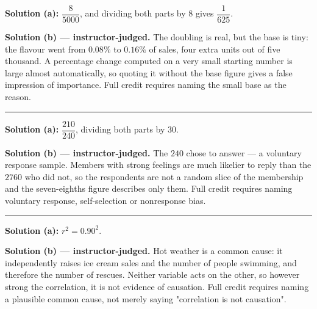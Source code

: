 \documentclass[12pt]{article}
\begin{document}




\textbf{Solution (a):} \quad $\dfrac{8}{5000}$, and dividing both parts by $8$ gives
$\dfrac{1}{625}$. 

\textbf{Solution (b) --- instructor-judged.} \quad The doubling is real, but the base is tiny:
the flavour went from $0.08\%$ to $0.16\%$ of sales, four extra units out of five thousand. A
percentage change computed on a very small starting number is large almost automatically, so
quoting it without the base figure gives a false impression of importance. Full credit requires
naming the small base as the reason.

\vspace{0.15cm}\noindent\rule{\linewidth}{0.2pt}\vspace{0.15cm}


\textbf{Solution (a):} \quad $\dfrac{210}{240}$, dividing both parts by $30$. 

\textbf{Solution (b) --- instructor-judged.} \quad The $240$ chose to answer --- a voluntary
response sample. Members with strong feelings are much likelier to reply than the $2760$ who
did not, so the respondents are not a random slice of the membership and the seven-eighths
figure describes only them. Full credit requires naming voluntary response, self-selection or
nonresponse bias.

\vspace{0.15cm}\noindent\rule{\linewidth}{0.2pt}\vspace{0.15cm}


\textbf{Solution (a):} \quad $r^2 = 0.90^2$. 

\textbf{Solution (b) --- instructor-judged.} \quad Hot weather is a common cause: it
independently raises ice cream sales and the number of people swimming, and therefore the
number of rescues. Neither variable acts on the other, so however strong the correlation, it is
not evidence of causation. Full credit requires naming a plausible common cause, not merely
saying "correlation is not causation".
\end{document}
